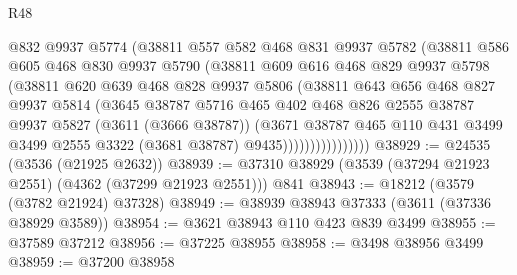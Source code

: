 \begin{lexlean}{R48}
\begin{coremodule}
                      @832
                      @9937
                      @5774
                      (@38811
                        @557
                        @582
                        @468
                        @831
                        @9937
                        @5782
                        (@38811
                          @586
                          @605
                          @468
                          @830
                          @9937
                          @5790
                          (@38811
                            @609
                            @616
                            @468
                            @829
                            @9937
                            @5798
                            (@38811
                              @620
                              @639
                              @468
                              @828
                              @9937
                              @5806
                              (@38811
                                @643
                                @656
                                @468
                                @827
                                @9937
                                @5814
                                (@3645
                                  @38787
                                  @5716
                                  @465
                                  @402
                                  @468
                                  @826
                                  @2555
                                  @38787
                                  @9937
                                  @5827
                                  (@3611 (@3666 @38787))
                                  (@3671
                                    @38787
                                    @465
                                    @110
                                    @431
                                    @3499
                                    @3499
                                    @2555
                                    @3322
                                    (@3681 @38787)
                                    @9435))))))))))))))))
@38929 := @24535 (@3536 (@21925 @2632))
@38939 := @37310 @38929 (@3539 (@37294 @21923 @2551) (@4362 (@37299 @21923 @2551))) @841
@38943 := @18212 (@3579 (@3782 @21924) @37328)
@38949 := @38939 @38943 @37333 (@3611 (@37336 @38929 @3589))
@38954 := @3621 @38943 @110 @423 @839 @3499
@38955 := @37589 @37212
@38956 := @37225 @38955
@38958 := @3498 @38956 @3499
@38959 := @37200 @38958

\end{coremodule}
\end{lexlean}
